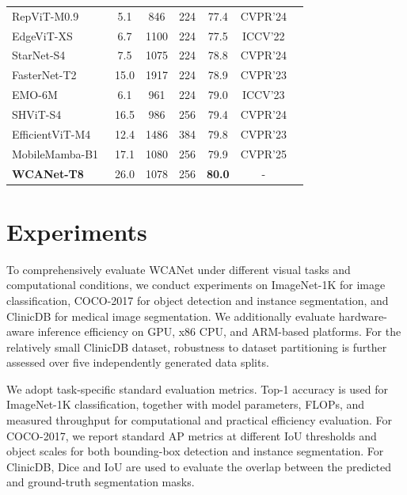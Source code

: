 \documentclass[a4paper,fleqn]{cas-dc}
\begin{document}
\begin{table} [pos=t]
\begin{tabular}{lcccccc}
RepViT-M0.9~\cite{wang2024repvit} & 5.1 & 846 & 224 & 77.4 & CVPR'24 \\
EdgeViT-XS~\cite{pan2022edgevits} & 6.7 & 1100 & 224 & 77.5 & ICCV'22 \\
StarNet-S4~\cite{ma2024rewrite} & 7.5 & 1075 & 224 & 78.8 & CVPR'24 \\
FasterNet-T2~\cite{chen2023run} & 15.0 & 1917 & 224 & 78.9  & CVPR'23 \\
EMO-6M~\cite{zhang2023rethinking} & 6.1 & 961 & 224 & 79.0 & ICCV'23 \\
SHViT-S4~\cite{yun2024shvit} & 16.5 & 986 & 256 & 79.4 & CVPR'24 \\
{EfficientViT-M4~\cite{liu2023efficientvit}} & 12.4 & 1486 & 384 & 79.8 & CVPR'23\\
MobileMamba-B1~\cite{he2025mobilemamba} & 17.1 & 1080 & 256 & 79.9 & CVPR'25 \\
\rowcolor[gray]{0.92}
\textbf{WCANet-T8} & 26.0 & 1078 & 256 & \textbf{80.0} & - \\
  \bottomrule
  \end{tabular}
  \vspace{-10pt}
\end{table}



\section{Experiments}


{\color{blue}
To comprehensively evaluate WCANet under different visual tasks and
computational conditions, we conduct experiments on ImageNet-1K for image
classification, COCO-2017 for object detection and instance segmentation,
and ClinicDB for medical image segmentation. We additionally evaluate
hardware-aware inference efficiency on GPU, x86 CPU, and ARM-based platforms.
For the relatively small ClinicDB dataset, robustness to dataset partitioning
is further assessed over five independently generated data splits.
}

{\color{blue}
We adopt task-specific standard evaluation metrics. Top-1 accuracy is used
for ImageNet-1K classification, together with model parameters, FLOPs, and
measured throughput for computational and practical efficiency evaluation.
For COCO-2017, we report standard AP metrics at different IoU thresholds
and object scales for both bounding-box detection and instance segmentation.
For ClinicDB, Dice and IoU are used to evaluate the overlap between the
predicted and ground-truth segmentation masks.
}
\end{document}
